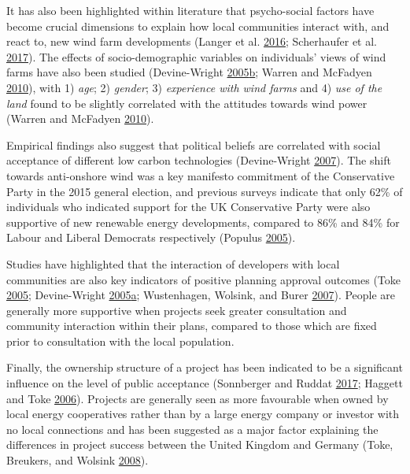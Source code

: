 \documentclass[a4paper,]{article}
\theoremstyle{definition}
\theoremstyle{definition}
\theoremstyle{definition}
\theoremstyle{remark}
\begin{document}
It has also been highlighted within literature that psycho-social
factors have become crucial dimensions to explain how local communities
interact with, and react to, new wind farm developments (Langer et al.
\protect\hyperlink{ref-Langer2016}{2016}; Scherhaufer et al.
\protect\hyperlink{ref-Scherhaufer2017}{2017}). The effects of
socio-demographic variables on individuals' views of wind farms have
also been studied (Devine-Wright
\protect\hyperlink{ref-Devine-Wright2005}{2005}\protect\hyperlink{ref-Devine-Wright2005}{b};
Warren and McFadyen \protect\hyperlink{ref-Warren2010}{2010}), with 1)
\emph{age}; 2) \emph{gender}; 3) \emph{experience with wind farms} and
4) \emph{use of the land} found to be slightly correlated with the
attitudes towards wind power (Warren and McFadyen
\protect\hyperlink{ref-Warren2010}{2010}).

Empirical findings also suggest that political beliefs are correlated
with social acceptance of different low carbon technologies
(Devine-Wright \protect\hyperlink{ref-Devine-Wright2007}{2007}). The
shift towards anti-onshore wind was a key manifesto commitment of the
Conservative Party in the 2015 general election, and previous surveys
indicate that only 62\% of individuals who indicated support for the UK
Conservative Party were also supportive of new renewable energy
developments, compared to 86\% and 84\% for Labour and Liberal Democrats
respectively (Populus \protect\hyperlink{ref-Populus2005}{2005}).

Studies have highlighted that the interaction of developers with local
communities are also key indicators of positive planning approval
outcomes (Toke \protect\hyperlink{ref-Toke2005}{2005}; Devine-Wright
\protect\hyperlink{ref-Devine-Wright2005a}{2005}\protect\hyperlink{ref-Devine-Wright2005a}{a};
Wustenhagen, Wolsink, and Burer
\protect\hyperlink{ref-Wustenhagen2007}{2007}). People are generally
more supportive when projects seek greater consultation and community
interaction within their plans, compared to those which are fixed prior
to consultation with the local population.

Finally, the ownership structure of a project has been indicated to be a
significant influence on the level of public acceptance (Sonnberger and
Ruddat \protect\hyperlink{ref-Sonnberger2017}{2017}; Haggett and Toke
\protect\hyperlink{ref-Haggett2006}{2006}). Projects are generally seen
as more favourable when owned by local energy cooperatives rather than
by a large energy company or investor with no local connections and has
been suggested as a major factor explaining the differences in project
success between the United Kingdom and Germany (Toke, Breukers, and
Wolsink \protect\hyperlink{ref-Toke2008}{2008}).
\end{document}
